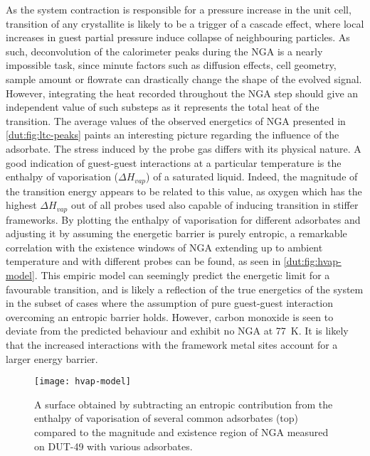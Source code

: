 As the system contraction is responsible for a pressure increase
in the unit cell, transition of any crystallite is likely to be a
trigger of a cascade effect, where local increases in guest partial 
pressure induce collapse of neighbouring particles. As such,
deconvolution of the calorimeter peaks during the NGA is a nearly 
impossible task, since minute factors such as diffusion effects,
cell geometry, sample amount or flowrate can drastically change 
the shape of the evolved signal. However, integrating the heat 
recorded throughout the NGA step should give an independent value of such
substeps as it represents the total heat of the transition. 
The average values of the observed energetics of 
NGA presented in \autoref{dut:fig:ltc-peaks} paints an interesting
picture regarding the influence of the adsorbate.
The stress induced by the probe gas differs with its physical
nature. A good indication of guest-guest interactions at 
a particular temperature is the enthalpy of vaporisation 
(\(\Delta H_{vap}\)) of a saturated liquid. Indeed, the magnitude
of the transition energy appears to be related to this value, as
oxygen which has the highest \(\Delta H_{vap}\) out of all probes 
used also capable of inducing transition in stiffer frameworks. By
plotting the enthalpy of vaporisation for different adsorbates
and adjusting it by assuming the energetic barrier is purely 
entropic, a remarkable correlation with the existence windows
of NGA extending up to ambient temperature and with different probes
can be found, as seen in \autoref{dut:fig:hvap-model}.
This empiric model can seemingly predict the energetic limit
for a favourable transition, and is likely a reflection of the 
true energetics of the system in the subset of cases where the 
assumption of pure guest-guest interaction overcoming an entropic
barrier holds. However, carbon monoxide is seen to deviate from
the predicted behaviour and exhibit no NGA at \SI{77}{\kelvin}. 
It is likely that the increased interactions with the framework metal
sites account for a larger energy barrier.

\begin{figure}[htb]
    \centering
    \texttt{[image: hvap-model]}%
    \caption{A surface obtained by subtracting an entropic 
    contribution from the enthalpy of vaporisation of 
    several common adsorbates (top) compared to the 
    magnitude and existence region of NGA measured on 
    DUT-49 with various adsorbates.}%
    \label{dut:fig:hvap-model}
\end{figure}

